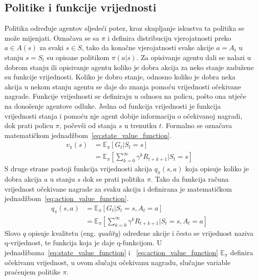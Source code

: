 \subsection{Politike i funkcije vrijednosti}
Politika određuje agentov sljedeći potez, kroz skupljanje iskustva ta politika se može mijenjati. Označava se sa $\pi$ i definira distribuciju vjerojatnosti preko $a \in A(s)$ za svaki $s \in S$, tako da konačne vjerojatnosti svake akcije $a = A_t$ u stanju $s = S_t$ su opisane politikom $\pi(a|s)$.
Za opisivanje agentu dali se nalazi u dobrom stanju ili opisivanje agentu koliko je dobra akcija za neko stanje zadužene su funkcije vrijednosti. Koliko je dobro stanje, odnosno koliko je dobra neka akcija u nekom stanju agentu se daje do znanja pomoću vrijednosti očekivane nagrade. Funkcije vrijednosti se definiraju u odnosu na policu, pošto ona utječe na donošenje agentove odluke.
Jedna od funkcija vrijednosti je funkcija vrijednosti stanja i pomoću nje agent dobije informaciju o očekivanoj nagradi, dok prati policu $\pi$, počevši od stanja $s$ u trenutku $t$. Formalno se označava matematičkom jednadžbom~\ref{eq:state_value_function}.
\begin{equation}\label{eq:state_value_function}
	\begin{split}
		v_\pi(s) &= \mathbb{E}_\pi[G_t | S_t = s] \\
				 &= \mathbb{E}_\pi\left[\sum_{k=0}^{\infty} \gamma^k R_{t+k+1} | S_t = s\right]
     \end{split}
\end{equation}
S druge strane postoji funkcija vrijednosti akcija $q_\pi(s, a)$ koja opisuje koliko je dobra akcija $a$ u stanju $s$ dok se prati politika $\pi$. Tako da funkcija računa vrijednost očekivane nagrade za svaku akciju i definirana je matematičkom jednadžbom~\ref{eq:action_value_function}.
\begin{equation}\label{eq:action_value_function}
\begin{split}
q_\pi(s, a) &= \mathbb{E}_\pi[G_t | S_t = s, A_t = a] \\
&= \mathbb{E}_\pi\left[\sum_{k=0}^{\infty} \gamma^k R_{t+k+1} | S_t = s, A_t = a\right]
\end{split}
\end{equation}
Slovo $q$ opisuje kvalitetu (eng. \textit{quality}) određene akcije i često se vrijednost naziva q-vrijednost, te funkcija koja je daje q-funkcijom. U jednadžbama~\ref{eq:state_value_function} i ~\ref{eq:action_value_function} $\mathbb{E}_\pi$ definira očekivanu vrijednost, u ovom slučaju očekivanu nagradu, slučajne variable praćenjem politike $\pi$.

